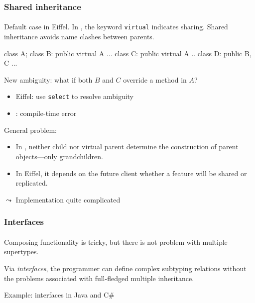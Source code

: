 \documentclass{beamer}
\begin{document}
\begin{frame}[fragile]
\frametitle{Shared inheritance}
\framesubtitle{}
Default case in Eiffel. In \cpp, the keyword \texttt{virtual} 
indicates sharing.
Shared inheritance avoids name clashes between parents.

\begin{cplus3}
class A;
class B: public virtual A {...}
class C: public virtual A {.. }
class D: public B, C {...}
\end{cplus3}



New ambiguity: what if both $B$ and $C$ override a method in $A$?
\begin{itemize}
\item Eiffel: use \texttt{select} to resolve ambiguity
\item \Cpp: compile-time error
\end{itemize}

General problem:


\begin{itemize}
\item In \Cpp, neither child nor virtual parent determine the construction
of parent objects---only grandchildren.
\item In Eiffel, it depends on the future client whether
a feature will be shared or replicated.
\end{itemize}
$\leadsto$ Implementation quite 
complicated 
\end{frame}

\begin{frame}
\frametitle{Interfaces}
\framesubtitle{}

Composing functionality is tricky, but there is not problem 
with multiple supertypes.

Via \emph{interfaces}, the programmer can define complex subtyping relations without
the problems associated with full-fledged multiple inheritance.

Example: interfaces in Java and C\#
\end{frame}


\end{document}
